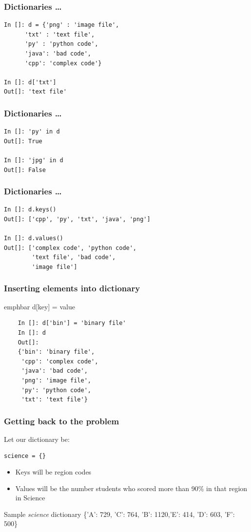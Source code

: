 \documentclass[14pt,compress]{beamer}
\newcommand{\emphbar}[1]
{\begin{beamercolorbox}[rounded=true]{emphbar} 
      {#1}
 \end{beamercolorbox}
}
\newcounter{time}
\newcommand{\inctime}[1]{\addtocounter{time}{#1}{\tiny \thetime\ m}}
\begin{document}
\begin{frame}[fragile]
  \frametitle{Dictionaries \ldots}
  \begin{lstlisting}
In []: d = {'png' : 'image file',
      'txt' : 'text file', 
      'py' : 'python code',
      'java': 'bad code', 
      'cpp': 'complex code'}

In []: d['txt']
Out[]: 'text file'
  \end{lstlisting}
\end{frame}

\begin{frame}[fragile]
  \frametitle{Dictionaries \ldots}
  \begin{lstlisting}
In []: 'py' in d
Out[]: True

In []: 'jpg' in d
Out[]: False
  \end{lstlisting}
\end{frame}

\begin{frame}[fragile]
  \frametitle{Dictionaries \ldots}
  \begin{small}
    \begin{lstlisting}
In []: d.keys()
Out[]: ['cpp', 'py', 'txt', 'java', 'png']

In []: d.values()
Out[]: ['complex code', 'python code',
        'text file', 'bad code', 
        'image file']
    \end{lstlisting}
  \end{small}
  \inctime{10}
\end{frame}

\begin{frame}[fragile]
  \frametitle{Inserting elements into dictionary}
  \emphbar{\alert{d[key] = value}}
  \begin{lstlisting}
    In []: d['bin'] = 'binary file'
    In []: d
    Out[]: 
    {'bin': 'binary file',
     'cpp': 'complex code',
     'java': 'bad code',
     'png': 'image file',
     'py': 'python code',
     'txt': 'text file'}
  \end{lstlisting}
\end{frame}

\begin{frame}[fragile]
  \frametitle{Getting back to the problem}
  Let our dictionary be:
  \begin{lstlisting}
science = {}
  \end{lstlisting}
\begin{itemize}
    \item Keys will be region codes
    \item Values will be the number students who scored more than 90\% in that region in Science
  \end{itemize}
  \begin{block}{Sample \emph{science} dictionary}
    \{'A': 729, 'C': 764, 'B': 1120,'E': 414, 'D': 603, 'F': 500\}
  \end{block}

\end{frame}
\end{document}
